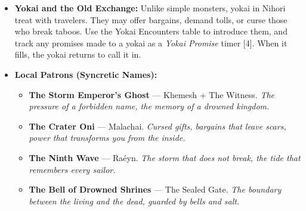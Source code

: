 \begin{itemize}
\begin{itemize}
  \end{itemize}
\item \textbf{Yokai and the Old Exchange:} Unlike simple monsters, yokai in Nihori treat with travelers. They may offer bargains, demand tolls, or curse those who break taboos. Use the Yokai Encounters table to introduce them, and track any promises made to a yokai as a \textit{Yokai Promise} timer [4]. When it fills, the yokai returns to call it in.
\item \textbf{Local Patrons (Syncretic Names):}
  \begin{itemize}
    \item \textbf{The Storm Emperor's Ghost} --- Khemesh + The Witness. \textit{The pressure of a forbidden name, the memory of a drowned kingdom.}
    \item \textbf{The Crater Oni} --- Malachai. \textit{Cursed gifts, bargains that leave scars, power that transforms you from the inside.}
    \item \textbf{The Ninth Wave} --- Ra{\'e}yn. \textit{The storm that does not break, the tide that remembers every sailor.}
    \item \textbf{The Bell of Drowned Shrines} --- The Sealed Gate. \textit{The boundary between the living and the dead, guarded by bells and salt.}
  \end{itemize}
\end{itemize}

